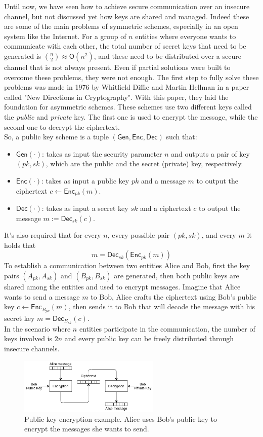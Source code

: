 Until now, we have seen how to achieve secure communication  over an insecure channel, but not discussed yet how keys are shared and managed. Indeed these are some of the main problems of symmetric schemes, especially in an open system like the Internet. For a group of $n$ entities where everyone wants to communicate with each other, the total number of secret keys that need to be generated is $\binom{n}{2} \approx \mathsf{O}(n^2)$, and these need to be distributed over a secure channel that is not always present.
Even if partial solutions were built to overcome these problems, they were not enough.
The first step to fully solve these problems was made in 1976 by Whitfield Diffie and Martin Hellman in a paper called "New Directions in Cryptography". With this paper, they laid the foundation for asymmetric schemes. These schemes use two different keys called the \emph{public} and \emph{private} key. The first one is used to encrypt the message, while the second one to decrypt the ciphertext.\\
So, a public key scheme is a tuple $(\mathsf{Gen}, \mathsf{Enc}, \mathsf{Dec})$ such that:
\begin{itemize}
    \item{$\mathsf{Gen}(\cdot)$: takes as input the security parameter $n$ and outputs a pair of key $(pk, sk)$, which are the public and the secret (private) key, respectively.}
    \item{$\mathsf{Enc}(\cdot)$: takes as input a public key $pk$ and a message $m$ to output the ciphertext $c \leftarrow \mathsf{Enc}_{pk}(m)$.}
    \item{$\mathsf{Dec}(\cdot)$: takes as input a secret key $sk$ and a ciphertext $c$ to output the message $m := \mathsf{Dec}_{sk}(c)$.}
\end{itemize}
It's also required that for every $n$, every possible pair $(pk, sk)$, and every $m$ it holds that
$$
m = \mathsf{Dec}_{sk}(\mathsf{Enc}_{pk}(m))
$$
To establish a communication between two entities Alice and Bob, first the key pairs $(A_{pk}, A_{sk})$ and $(B_{pk}, B_{sk})$ are generated, then both public keys are shared among the entities and used to encrypt messages. Imagine that Alice wants to send a message $m$ to Bob, Alice crafts the ciphertext using Bob's public key $c \leftarrow  \mathsf{Enc}_{B_{pk}}(m)$, then sends it to Bob that will decode the message with his secret key $m = \mathsf{Dec}_{B_{sk}}(c)$.\\
In the scenario where $n$ entities participate in the communication, the number of keys involved is $2n$ and every public key can be freely distributed through insecure channels.
\begin{figure}[H]
    \centering
    \includegraphics[width=0.6\textwidth]{img/public-key/encryption.png}
    \caption[Public key encryption example.]{Public key encryption example. Alice uses Bob's public key to encrypt the messages she wants to send.}
\end{figure}
